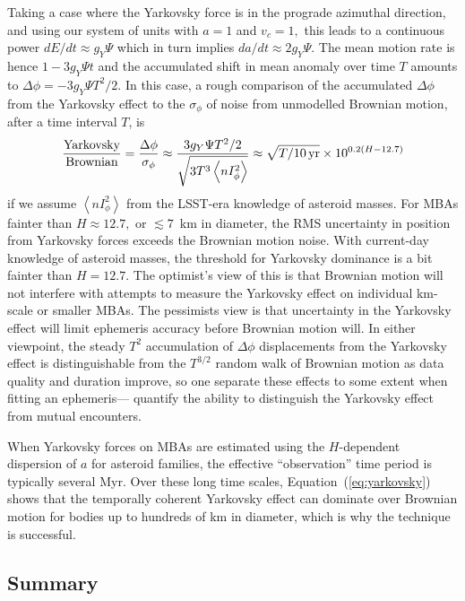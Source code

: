 \documentclass[linenumbers, onecolumn]{aastex631}
\newcommand{\eqq}[1]{Equation~(\ref{#1})}
\newcommand\edited[1]{{\color{blue} {#1}}}
\newcommand{\nIphi}{\left\langle nI_\phi^2\right\rangle}
\begin{document}
Taking a case where the Yarkovsky force is in the prograde azimuthal direction, and using our system of units with $a=1$ and $v_c=1,$ this leads to a continuous power $dE/dt\approx g_Y\Psi$ which in turn implies $da/dt\approx2g_Y\Psi.$   The mean motion rate is hence $1-3 g_Y\Psi t$ and the accumulated shift in mean anomaly over time $T$ amounts to $\Delta\phi = -3 g_Y \Psi  T^2/2.$   In this case, a rough comparison of the accumulated $\Delta\phi$ from the Yarkovsky effect to the $\sigma_\phi$ of noise from unmodelled Brownian motion, after a time interval $T$, is
\begin{equation}
\frac{\textrm{Yarkovsky}}{\textrm{Brownian}} = 
   \frac{\Delta\phi}{\sigma_\phi} \approx \frac{ 3 g_Y \Psi
     T^2/2}{\sqrt{3 T^3 \nIphi}} \approx \sqrt{T/10\,{\rm yr}} \times 10^{0.2(H-12.7)}
     \label{eq:yarkovsky}
\end{equation}
\edited{if we assume $\nIphi$ from the LSST-era knowledge of asteroid
  masses.   For MBAs fainter than $H\approx12.7,$ or
  $\lesssim7$~km in diameter, the RMS uncertainty in position from
  Yarkovsky forces exceeds the Brownian motion noise.   With current-day knowledge
  of asteroid masses, the threshold for Yarkovsky dominance is a bit
  fainter than $H=12.7.$  The optimist's view of this is that Brownian
  motion will not interfere with attempts to measure the Yarkovsky
  effect on individual km-scale or smaller MBAs.  The pessimists view is that uncertainty in
 the  Yarkovsky effect will limit ephemeris accuracy before Brownian
  motion will.  In either viewpoint, the steady $T^2$ accumulation of
  $\Delta\phi$ displacements from the Yarkovsky effect is
  distinguishable from the $T^{3/2}$ random walk of Brownian motion as
  data quality and duration improve, so one separate these effects to
  some extent when fitting an ephemeris---\citet{negin} quantify the
  ability to distinguish the Yarkovsky effect from mutual encounters.}

When Yarkovsky forces on MBAs are estimated using the $H$-dependent
dispersion of $a$ for asteroid families, the effective ``observation''
time period is typically several Myr.  Over these long time scales,
\eqq{eq:yarkovsky} shows that the temporally coherent Yarkovsky effect
can dominate over Brownian motion for bodies up to hundreds of km
in diameter, which is why the technique is successful.

\subsection{Summary}
\end{document}
